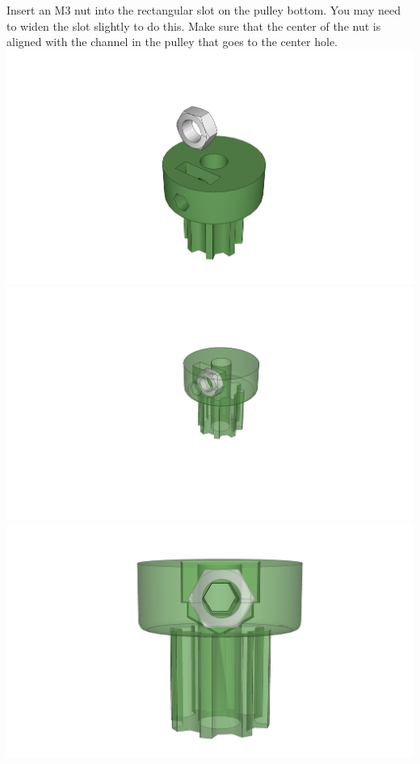 \documentclass[twoside,openany,a4paper,titlepage]{memoir}
\begin{document}
	\section{}
	Insert an M3 nut into the rectangular slot on the pulley bottom. You may need to widen the slot slightly
	to do this. Make sure that the center of the nut is aligned with the channel in the pulley that goes to the
	center hole.\\
	\includegraphics[width=1\linewidth]{graphics/ch6_14_1.png}
	\includegraphics[width=1\linewidth]{graphics/ch6_14_2.png}
	\includegraphics[width=1\linewidth]{graphics/ch6_14_3.png}
	
\end{document}
